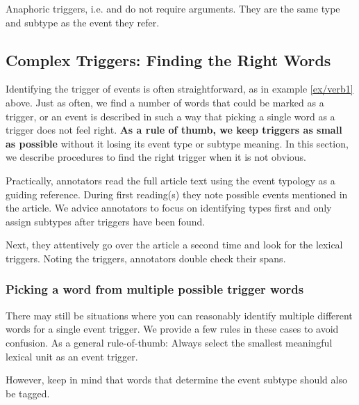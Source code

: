 Anaphoric triggers, i.e.  and  do not require arguments.
They are the same type and subtype as the event they refer.


\subsection{Complex Triggers: Finding the Right Words}

Identifying the trigger of events is often straightforward, as in example \ref{ex/verb1} above.
Just as often, we find a number of words that could be marked as a trigger, or an event is described in such a way that picking a single word as a trigger does not feel right.
\textbf{As a rule of thumb, we keep triggers as small as possible} without it losing its event type or subtype meaning.
In this section, we describe procedures to find the right trigger when it is not obvious.

Practically, annotators read the full article text using the event typology as a guiding reference.
During first reading(s) they note possible events mentioned in the article.
We advice annotators to focus on identifying types first and only assign subtypes after triggers have been found.

Next, they attentively go over the article a second time and look for the lexical triggers.
Noting the triggers, annotators double check their spans.


\subsubsection{Picking a word from multiple possible trigger words}

There may still be situations where you can reasonably identify multiple different words for a single event trigger.
We provide a few rules in these cases to avoid confusion.
As a general rule-of-thumb: Always select the smallest meaningful lexical unit as an event trigger.

However, keep in mind that words that determine the event subtype should also be tagged.

